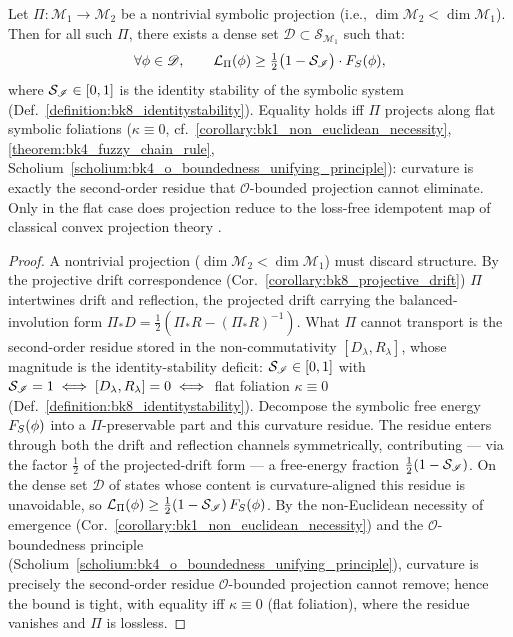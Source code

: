 \begin{theorem}
\label{theorem:bk8_no_free_projection}
Let $\Pi : \mathcal{M}_1 \to \mathcal{M}_2$ be a nontrivial symbolic projection (i.e., $\dim \mathcal{M}_2 < \dim \mathcal{M}_1$).  
Then for all such $\Pi$, there exists a dense set $\mathscr{D} \subset \mathscr{S}_{\mathcal{M}_1}$ such that:
\[
\forall \phi \in \mathscr{D}, \qquad 
\mathcal{L}_\Pi(\phi) \ge \tfrac{1}{2} \bigl(1 - \mathcal{S}_{\mathscr{I}}\bigr) \cdot F_S(\phi),
\]
where $\mathcal{S}_{\mathscr{I}} \in [0,1]$ is the identity stability of the symbolic system (Def.~\ref{definition:bk8_identitystability}).
Equality holds iff $\Pi$ projects along flat symbolic foliations ($\kappa \equiv 0$, cf.~\ref{corollary:bk1_non_euclidean_necessity}, \ref{theorem:bk4_fuzzy_chain_rule}, Scholium~\ref{scholium:bk4_o_boundedness_unifying_principle}): curvature is exactly the second-order residue that $\mathcal{O}$-bounded projection cannot eliminate. Only in the flat case does projection reduce to the loss-free idempotent map of classical convex projection theory \citep{bauschke1996projection}.
\end{theorem}
\begin{proof}
\label{proof:bk8_no_free_projection}
\leavevmode
A nontrivial projection ($\dim\mathcal{M}_2<\dim\mathcal{M}_1$) must discard structure. By the projective drift correspondence (Cor.~\ref{corollary:bk8_projective_drift}) $\Pi$ intertwines drift and reflection, the projected drift carrying the balanced-involution form $\Pi_*D=\tfrac12(\Pi_*R-(\Pi_*R)^{-1})$. What $\Pi$ cannot transport is the second-order residue stored in the non-commutativity $[D_\lambda,R_\lambda]$, whose magnitude is the identity-stability deficit: $\mathcal{S}_{\mathscr{I}}\in[0,1]$ with $\mathcal{S}_{\mathscr{I}}=1\iff[D_\lambda,R_\lambda]=0\iff$ flat foliation $\kappa\equiv 0$ (Def.~\ref{definition:bk8_identitystability}). Decompose the symbolic free energy $F_S(\phi)$ into a $\Pi$-preservable part and this curvature residue. The residue enters through both the drift and reflection channels symmetrically, contributing --- via the factor $\tfrac12$ of the projected-drift form --- a free-energy fraction $\tfrac12(1-\mathcal{S}_{\mathscr{I}})$. On the dense set $\mathscr{D}$ of states whose content is curvature-aligned this residue is unavoidable, so $\mathcal{L}_\Pi(\phi)\ge\tfrac12(1-\mathcal{S}_{\mathscr{I}})\,F_S(\phi)$. By the non-Euclidean necessity of emergence (Cor.~\ref{corollary:bk1_non_euclidean_necessity}) and the $\mathcal{O}$-boundedness principle (Scholium~\ref{scholium:bk4_o_boundedness_unifying_principle}), curvature is precisely the second-order residue $\mathcal{O}$-bounded projection cannot remove; hence the bound is tight, with equality iff $\kappa\equiv 0$ (flat foliation), where the residue vanishes and $\Pi$ is lossless.
\end{proof}

